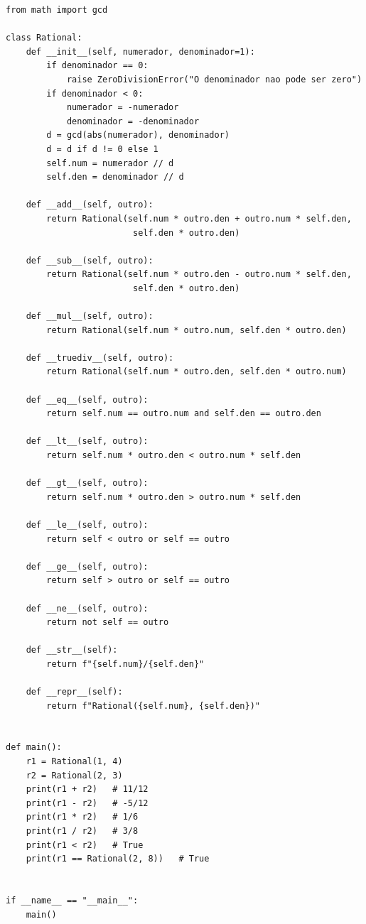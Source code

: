 \documentclass[11pt,a4paper]{article}
\begin{document}
\begin{solucao}
\begin{lstlisting}
from math import gcd

class Rational:
    def __init__(self, numerador, denominador=1):
        if denominador == 0:
            raise ZeroDivisionError("O denominador nao pode ser zero")
        if denominador < 0:
            numerador = -numerador
            denominador = -denominador
        d = gcd(abs(numerador), denominador)
        d = d if d != 0 else 1
        self.num = numerador // d
        self.den = denominador // d

    def __add__(self, outro):
        return Rational(self.num * outro.den + outro.num * self.den,
                         self.den * outro.den)

    def __sub__(self, outro):
        return Rational(self.num * outro.den - outro.num * self.den,
                         self.den * outro.den)

    def __mul__(self, outro):
        return Rational(self.num * outro.num, self.den * outro.den)

    def __truediv__(self, outro):
        return Rational(self.num * outro.den, self.den * outro.num)

    def __eq__(self, outro):
        return self.num == outro.num and self.den == outro.den

    def __lt__(self, outro):
        return self.num * outro.den < outro.num * self.den

    def __gt__(self, outro):
        return self.num * outro.den > outro.num * self.den

    def __le__(self, outro):
        return self < outro or self == outro

    def __ge__(self, outro):
        return self > outro or self == outro

    def __ne__(self, outro):
        return not self == outro

    def __str__(self):
        return f"{self.num}/{self.den}"

    def __repr__(self):
        return f"Rational({self.num}, {self.den})"


def main():
    r1 = Rational(1, 4)
    r2 = Rational(2, 3)
    print(r1 + r2)   # 11/12
    print(r1 - r2)   # -5/12
    print(r1 * r2)   # 1/6
    print(r1 / r2)   # 3/8
    print(r1 < r2)   # True
    print(r1 == Rational(2, 8))   # True


if __name__ == "__main__":
    main()
\end{lstlisting}
\end{solucao}
\end{document}
